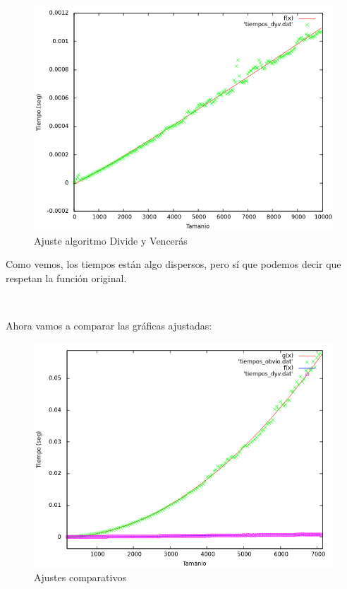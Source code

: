 \documentclass{article}
\begin{document}
	\begin{figure}[H]
		\centering
		\includegraphics[totalheight=8cm]{img/DyV_ajustada}
		\caption{Ajuste algoritmo Divide y Vencerás}
		\label{fig:DyV_ajustada}
	\end{figure}
	
	Como vemos, los tiempos están algo dispersos, pero sí que podemos decir que respetan la función original.
	
	\
	
	Ahora vamos a comparar las gráficas ajustadas:
	
	\begin{figure}[H]
		\centering
		\includegraphics[totalheight=8cm]{img/ajustes_total}
		\caption{Ajustes comparativos}
		\label{fig:ajustes_total}
	\end{figure}
\end{document}
